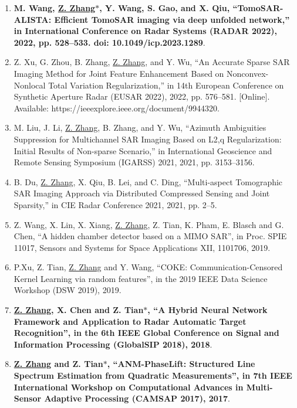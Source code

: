 \documentclass[paper=a4,fontsize=11pt]{scrartcl}
\begin{document}
\begin{enumerate}
	\item \textbf{M. Wang, \underline{Z. Zhang$\ast$}, Y. Wang, S. Gao, and X. Qiu, ``TomoSAR-ALISTA: Efficient TomoSAR imaging via deep unfolded network,'' in International Conference on Radar Systems (RADAR 2022), 2022, pp. 528–533. doi: 10.1049/icp.2023.1289}.
	
	\item Z. Xu, G. Zhou, B. Zhang, \underline{Z. Zhang}, and Y. Wu, ``An Accurate Sparse SAR Imaging Method for Joint Feature Enhancement Based on Nonconvex-Nonlocal Total Variation Regularization,'' in 14th European Conference on Synthetic Aperture Radar (EUSAR 2022), 2022, pp. 576–581. [Online]. Available: https://ieeexplore.ieee.org/document/9944320.
	
	\item M. Liu, J. Li, \underline{Z. Zhang}, B. Zhang, and Y. Wu, ``Azimuth Ambiguities Suppression for Multichannel SAR Imaging Based on L2,q Regularization: Initial Results of Non-sparse Scenario,'' in International Geoscience and Remote Sensing Symposium (IGARSS) 2021, 2021, pp. 3153–3156.
	
	\item B. Du, \underline{Z. Zhang}, X. Qiu, B. Lei, and C. Ding, ``Multi-aspect Tomographic SAR Imaging Approach via Distributed Compressed Sensing and Joint Sparsity,'' in CIE Radar Conference 2021, 2021, pp. 2–5.
	
	\item {Z. Wang, X. Lin, X. Xiang, \underline{Z. Zhang}, Z. Tian, K. Pham, E. Blasch and G. Chen, ``A hidden chamber detector based on a MIMO SAR'', in Proc. SPIE 11017, Sensors and Systems for Space Applications XII, 1101706, 2019}.
	
	\item {P.Xu, Z. Tian, \underline{Z. Zhang} and Y. Wang, ``COKE: Communication-Censored Kernel Learning via random features'', in the 2019 IEEE Data Science Workshop (DSW 2019), 2019}.
	
	\item \textbf{\underline{Z. Zhang}, X. Chen and Z. Tian$\ast$, ``A Hybrid Neural Network Framework and Application to Radar Automatic Target Recognition'', in the 6th IEEE Global Conference on Signal and Information Processing (GlobalSIP 2018), 2018}.
	
	\item \textbf{\underline{Z. Zhang} and Z. Tian$\ast$, ``ANM-PhaseLift: Structured Line Spectrum Estimation from Quadratic Measurements'', in 7th IEEE International Workshop on Computational Advances in Multi-Sensor Adaptive Processing (CAMSAP 2017), 2017}.
	

\end{enumerate}
\end{document}
